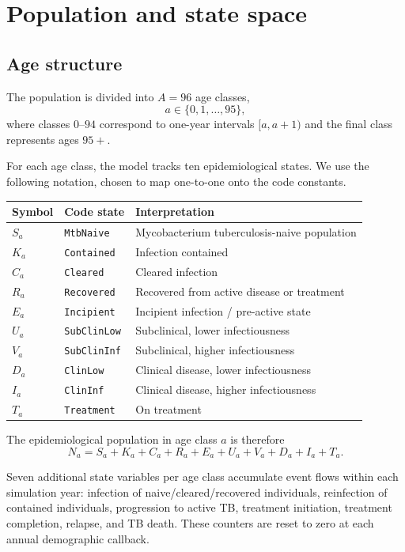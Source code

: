 \documentclass[11pt]{article}
\newcommand{\code}[1]{\texttt{#1}}
\begin{document}
\section{Population and state space}

\subsection{Age structure}

The population is divided into $A=96$ age classes,
\[
a\in\{0,1,\ldots,95\},
\]
where classes $0$--$94$ correspond to one-year intervals $[a,a+1)$ and the final class represents ages $95+$.

For each age class, the model tracks ten epidemiological states. We use the following notation, chosen to map one-to-one onto the code constants.

\begin{longtable}{>{\raggedright\arraybackslash}p{}>{\raggedright\arraybackslash}p{}>{\raggedright\arraybackslash}p{}}
\toprule
Symbol & Code state & Interpretation \\
\midrule
$S_a$ & \code{MtbNaive} & Mycobacterium tuberculosis-naive population \\
$K_a$ & \code{Contained} & Infection contained \\
$C_a$ & \code{Cleared} & Cleared infection \\
$R_a$ & \code{Recovered} & Recovered from active disease or treatment \\
$E_a$ & \code{Incipient} & Incipient infection / pre-active state \\
$U_a$ & \code{SubClinLow} & Subclinical, lower infectiousness \\
$V_a$ & \code{SubClinInf} & Subclinical, higher infectiousness \\
$D_a$ & \code{ClinLow} & Clinical disease, lower infectiousness \\
$I_a$ & \code{ClinInf} & Clinical disease, higher infectiousness \\
$T_a$ & \code{Treatment} & On treatment \\
\bottomrule
\end{longtable}

The epidemiological population in age class $a$ is therefore
\begin{equation}
N_a=S_a+K_a+C_a+R_a+E_a+U_a+V_a+D_a+I_a+T_a.
\label{eq:agepop}
\end{equation}

Seven additional state variables per age class accumulate event flows within each simulation year: infection of naive/cleared/recovered individuals, reinfection of contained individuals, progression to active TB, treatment initiation, treatment completion, relapse, and TB death. These counters are reset to zero at each annual demographic callback.
\end{document}
